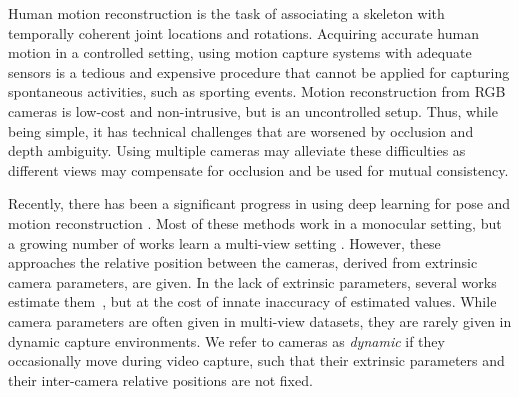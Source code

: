 

Human motion reconstruction is the task of associating a skeleton with
temporally coherent joint locations and rotations. 
Acquiring accurate human motion in a controlled setting, using motion capture systems with adequate sensors is a tedious and expensive procedure that cannot be applied for capturing spontaneous activities, such as sporting events.
%
Motion reconstruction from RGB cameras is low-cost and non-intrusive, but is an uncontrolled setup. Thus, while being simple, it has technical challenges that are worsened by occlusion and depth ambiguity. 
%
Using multiple cameras may alleviate these difficulties as different views may compensate for occlusion and be used for mutual consistency. 

Recently, there has been a significant progress in using deep learning for pose and motion reconstruction \cite{pavlakos2018ordinal,liu2019improving,sarandi2020metric,shi2020motionet,pavllo20193d,kocabas2020vibe,mehta2020xnect}. Most of these methods work in a monocular setting, but a growing number of works learn a multi-view setting \cite{iskakov2019learnable,tu2020voxelpose,qiu2019cross,he2020epipolar,dong2019fast,rhodin2018learning}. However, these approaches 
 the 
relative position 
between the cameras, derived from extrinsic camera parameters,  are given.
%
In the lack of extrinsic parameters, several works estimate them~\cite{chu_and_pan_semisupervised,kocabas2019selfsupervised}, 
but at the cost of innate inaccuracy of estimated values.
While camera parameters are often given in multi-view datasets, they are rarely given in dynamic capture environments. We refer to cameras as \emph{dynamic} if they occasionally move during video capture, such that their extrinsic parameters and their inter-camera relative positions are not fixed. 



